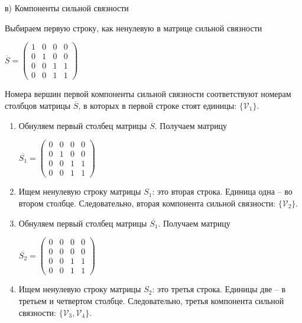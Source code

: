 \vspace{\baselineskip}

в) Компоненты сильной связности

Выбираем первую строку, как ненулевую в матрице сильной связности

\vspace{\baselineskip}

$\overline{S} = \begin{pmatrix}1 & 0 & 0 & 0 \\0 & 1 & 0 & 0\\0 & 0 & 1 & 1\\0 & 0 & 1 & 1\end{pmatrix}$

\vspace{\baselineskip}

Номера вершин первой компоненты сильной связности соответствуют номерам столбцов матрицы $\overline{S}$, в которых в первой строке стоят единицы: $\{\mathcal{V}_1\}$.

\begin{enumerate}
\item Обнуляем первый столбец матрицы $\overline{S}$. Получаем матрицу

$\overline{S_1} = \begin{pmatrix}0 & 0 & 0 & 0 \\0 & 1 & 0 & 0\\0 & 0 & 1 & 1\\0 & 0 & 1 & 1\end{pmatrix}$

\item Ищем ненулевую строку матрицы ${S_1}$: это вторая строка. Единица одна -- во втором столбце. Следовательно, вторая компонента сильной связности: $\{\mathcal{V}_2\}$.

\item Обнуляем первый столбец матрицы $\overline{S_1}$. Получаем матрицу

$\overline{S_2} = \begin{pmatrix}0 & 0 & 0 & 0 \\0 & 0 & 0 & 0\\0 & 0 & 1 & 1\\0 & 0 & 1 & 1\end{pmatrix}$

\item Ищем ненулевую строку матрицы ${S_2}$: это третья строка. Единицы две -- в третьем и четвертом столбце. Следовательно, третья компонента сильной связности: $\{\mathcal{V}_3 , \mathcal{V}_4\}$.
\end{enumerate}


